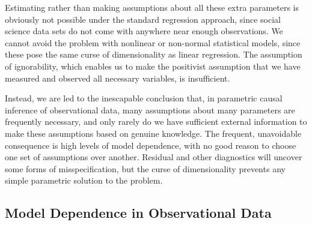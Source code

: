 \documentclass[11pt,titlepage]{article}
\begin{document}
Estimating rather than making assumptions about all these extra
parameters is obviously not possible under the standard regression
approach, since social science data sets do not come with anywhere
near enough observations.  We cannot avoid the problem with nonlinear
or non-normal statistical models, since these pose the same curse of
dimensionality as linear regression.  The assumption of ignorability,
which enables us to make the positivist assumption that we have
measured and observed all necessary variables, is insufficient.

Instead, we are led to the inescapable conclusion that, in parametric
causal inference of observational data, many assumptions about many
parameters are frequently necessary, and only rarely do we have
sufficient external information to make these assumptions based on
genuine knowledge.  The frequent, unavoidable consequence is high
levels of model dependence, with no good reason to choose one set of
assumptions over another.  Residual and other diagnostics will uncover
some forms of misspecification, but the curse of dimensionality
prevents any simple parametric solution to the problem.

\subsection{Model Dependence in Observational Data}\label{s:modeldep}
\end{document}
